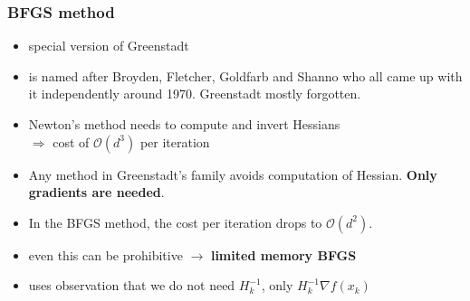 \documentclass[aspectratio=149]{beamer}
\begin{document}
\begin{frame}
  \frametitle{BFGS method}
  \begin{itemize}
    \item special version of Greenstadt
    \item is named after Broyden, Fletcher, Goldfarb and Shanno
          who all came up with it independently around 1970. Greenstadt mostly forgotten.
    \item Newton’s method needs to compute and invert Hessians\\
          $\Rightarrow$ cost of $\mathcal{O}(d^3)$ per iteration
    \item Any method in Greenstadt's family avoids computation of Hessian.
          \textbf{Only gradients are needed}.
    \item In the BFGS method, the cost per iteration drops to $\mathcal{O}(d^2)$.
    \item even this can be prohibitive $\rightarrow$ \textbf{limited memory BFGS}
    \item uses observation that we do not need $H_{k}^{-1}$, only $H_{k}^{-1} \nabla f(x_k)$
  \end{itemize}

\end{frame}
\end{document}

